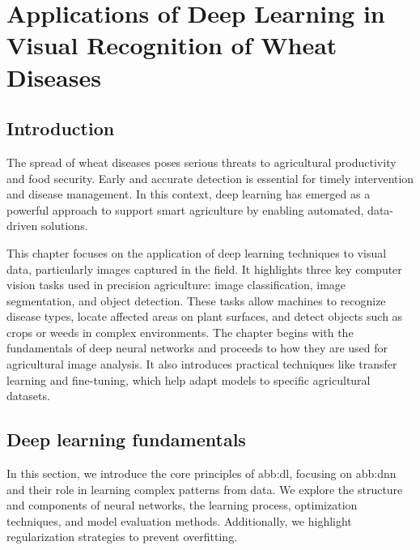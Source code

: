 
\chapter{Applications of Deep Learning in Visual Recognition of Wheat Diseases}

\section{Introduction}

The spread of wheat diseases poses serious threats to agricultural productivity and food security. Early and accurate detection is essential for timely intervention and disease management. In this context, deep learning has emerged as a powerful approach to support smart agriculture by enabling automated, data-driven solutions.

This chapter focuses on the application of deep learning techniques to visual data, particularly images captured in the field. It highlights three key computer vision tasks used in precision agriculture: image classification, image segmentation, and object detection. These tasks allow machines to recognize disease types, locate affected areas on plant surfaces, and detect objects such as crops or weeds in complex environments. The chapter begins with the fundamentals of deep neural networks and proceeds to how they are used for agricultural image analysis. It also introduces practical techniques like transfer learning and fine-tuning, which help adapt models to specific agricultural datasets.



\section{Deep learning fundamentals}
In this section, we introduce the core principles of \gls{abb:dl}, focusing on \gls{abb:dnn} and their role in learning complex patterns from data. We explore the structure and components of neural networks, the learning process, optimization techniques, and model evaluation methods. Additionally, we highlight regularization strategies to prevent overfitting.

